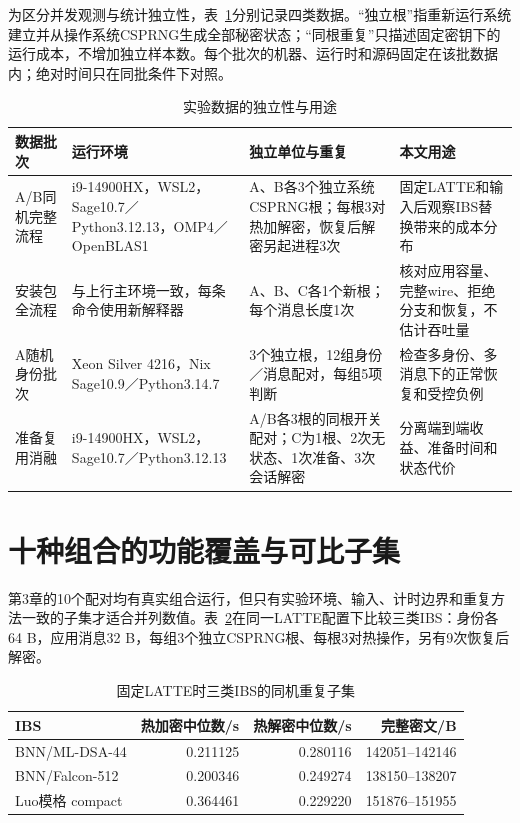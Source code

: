 \documentclass[UTF8,a4paper,12pt,oneside,openany,fontset=fandol]{ctexrep}
\begin{document}
为区分并发观测与统计独立性，表~\ref{tab:evidence-levels}分别记录四类数据。“独立根”指重新运行系统建立并从操作系统CSPRNG生成全部秘密状态；“同根重复”只描述固定密钥下的运行成本，不增加独立样本数。每个批次的机器、运行时和源码固定在该批数据内；绝对时间只在同批条件下对照。

\begin{table}[htbp]
\centering
\small
\caption{实验数据的独立性与用途}
\label{tab:evidence-levels}
\begin{tabularx}{\textwidth}{@{}>{\raggedright\arraybackslash}p{}>{\raggedright\arraybackslash}p{}>{\raggedright\arraybackslash}p{}>{\raggedright\arraybackslash}X@{}}
\toprule
\rowcolor{black!8} 数据批次 & 运行环境 & 独立单位与重复 & 本文用途 \\
\midrule
A/B同机完整流程 & i9-14900HX，WSL2，Sage10.7／Python3.12.13，OMP4／OpenBLAS1 & A、B各3个独立系统CSPRNG根；每根3对热加解密，恢复后解密另起进程3次 & 固定LATTE和输入后观察IBS替换带来的成本分布 \\
安装包全流程 & 与上行主环境一致，每条命令使用新解释器 & A、B、C各1个新根；每个消息长度1次 & 核对应用容量、完整wire、拒绝分支和恢复，不估计吞吐量 \\
A随机身份批次 & Xeon Silver 4216，Nix Sage10.9／Python3.14.7 & 3个独立根，12组身份／消息配对，每组5项判断 & 检查多身份、多消息下的正常恢复和受控负例 \\
准备复用消融 & i9-14900HX，WSL2，Sage10.7／Python3.12.13 & A/B各3根的同根开关配对；C为1根、2次无状态、1次准备、3次会话解密 & 分离端到端收益、准备时间和状态代价 \\
\bottomrule
\end{tabularx}
\end{table}

\section{十种组合的功能覆盖与可比子集}
第3章的10个配对均有真实组合运行，但只有实验环境、输入、计时边界和重复方法一致的子集才适合并列数值。表~\ref{tab:latte-three-ibs}在同一LATTE配置下比较三类IBS：身份各64 B，应用消息32 B，每组3个独立CSPRNG根、每根3对热操作，另有9次恢复后解密。

\begin{table}[htbp]
\centering
\small
\caption{固定LATTE时三类IBS的同机重复子集}
\label{tab:latte-three-ibs}
\begin{tabular}{@{}lrrr@{}}
\toprule
\rowcolor{black!8} IBS & 热加密中位数/s & 热解密中位数/s & 完整密文/B \\
\midrule
BNN/ML-DSA-44 & 0.211125 & 0.280116 & 142051--142146 \\
BNN/Falcon-512 & 0.200346 & 0.249274 & 138150--138207 \\
Luo模格 compact & 0.364461 & 0.229220 & 151876--151955 \\
\bottomrule
\end{tabular}
\end{table}
\end{document}
